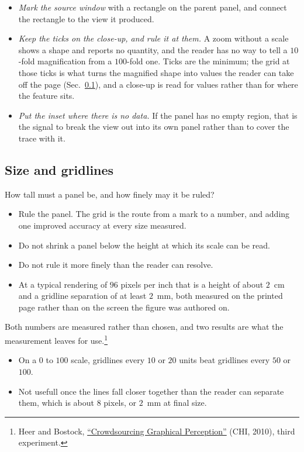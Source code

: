 \begin{itemize}
	\item \emph{Mark the source window} with a rectangle on the parent panel, and connect the rectangle to the view it produced. 
	\item \emph{Keep the ticks on the close-up, and rule it at them.} A zoom without a scale shows a shape and reports no quantity, and the reader has no way to tell a $10$-fold magnification from a $100$-fold one. Ticks are the minimum; the grid at those ticks is what turns the magnified shape into values the reader can take off the page (Sec.~\ref{sec-app-plot-gridlines}), and a close-up is read for values rather than for where the feature sits.
	\item \emph{Put the inset where there is no data.} If the panel has no empty region, that is the signal to break the view out into its own panel rather than to cover the trace with it.
\end{itemize}
\FloatBarrier

\subsection{Size and gridlines}\label{sec-app-plot-gridlines}
\begin{goal}
	How tall must a panel be, and how finely may it be ruled?
\end{goal}
\begin{box_yellow}
\begin{itemize}
	\item Rule the panel. The grid is the route from a mark to a number, and adding one improved accuracy at every size measured.
	\item Do not shrink a panel below the height at which its scale can be read.
	\item Do not rule it more finely than the reader can resolve. 
	\item At a typical rendering of $96$ pixels per inch that is a height of about $2$~cm and a gridline separation of at least $2$~mm, both measured on the printed page rather than on the screen the figure was authored on.
\end{itemize}	
\end{box_yellow}

Both numbers are measured rather than chosen, and two results are what the measurement leaves for use.\footnote{Heer and Bostock, \href{https://doi.org/10.1145/1753326.1753357}{``Crowdsourcing Graphical Perception''} (CHI, 2010), third experiment.} 
\begin{itemize}
	\item On a $0$ to $100$ scale, gridlines every $10$ or $20$ units beat gridlines every $50$ or $100$.
	\item Not usefull once the lines fall closer together than the reader can separate them, which is about $8$ pixels, or $2$~mm at final size.
\end{itemize}

